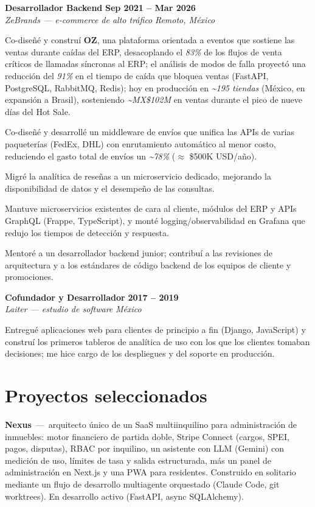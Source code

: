 \documentclass[10pt,a4paper]{article}
\newcommand{\rol}[4]{%
  \textbf{#1} \hfill \textbf{#3}\\[1pt]
  {\color{soft}\textit{#2} \hfill \textit{#4}}\par\vspace{2pt}}
\newcommand{\proyecto}[2]{\textbf{#1} \,---\, #2\par\vspace{1pt}}
\begin{document}
\rol{Desarrollador Backend}{ZeBrands — e-commerce de alto tráfico}{Sep 2021 -- Mar 2026}{Remoto, México}
\begin{tight}
  \item Co-diseñé y construí \textbf{OZ}, una plataforma orientada a eventos que sostiene las ventas durante caídas del ERP, desacoplando el \textit{83\%} de los flujos de venta críticos de llamadas síncronas al ERP; el análisis de modos de falla proyectó una reducción del \textit{91\%} en el tiempo de caída que bloquea ventas (FastAPI, PostgreSQL, RabbitMQ, Redis); hoy en producción en \textit{\textasciitilde195 tiendas} (México, en expansión a Brasil), sosteniendo \textit{\textasciitilde MX\$102M} en ventas durante el pico de nueve días del Hot Sale.
  \item Co-diseñé y desarrollé un middleware de envíos que unifica las APIs de varias paqueterías (FedEx, DHL) con enrutamiento automático al menor costo, reduciendo el gasto total de envíos un \textit{\textasciitilde78\%} ($\approx$ \$500K USD/año).
  \item Migré la analítica de reseñas a un microservicio dedicado, mejorando la disponibilidad de datos y el desempeño de las consultas.
  \item Mantuve microservicios existentes de cara al cliente, módulos del ERP y APIs GraphQL (Frappe, TypeScript), y monté logging/observabilidad en Grafana que redujo los tiempos de detección y respuesta.
  \item Mentoré a un desarrollador backend junior; contribuí a las revisiones de arquitectura y a los estándares de código backend de los equipos de cliente y promociones.
\end{tight}
\vspace{2pt}

\rol{Cofundador y Desarrollador}{Laiter — estudio de software}{2017 -- 2019}{México}
\begin{tight}
  \item Entregué aplicaciones web para clientes de principio a fin (Django, JavaScript) y construí los primeros tableros de analítica de uso con los que los clientes tomaban decisiones; me hice cargo de los despliegues y del soporte en producción.
\end{tight}

\section*{Proyectos seleccionados}
\begin{tight}
  \item \proyecto{Nexus}{arquitecto único de un SaaS multiinquilino para administración de inmuebles: motor financiero de partida doble, Stripe Connect (cargos, SPEI, pagos, disputas), RBAC por inquilino, un asistente con LLM (Gemini) con medición de uso, límites de tasa y salida estructurada, más un panel de administración en Next.js y una PWA para residentes. Construido en solitario mediante un flujo de desarrollo multiagente orquestado (Claude Code, git worktrees). En desarrollo activo (FastAPI, async SQLAlchemy).}
\end{tight}
\end{document}

